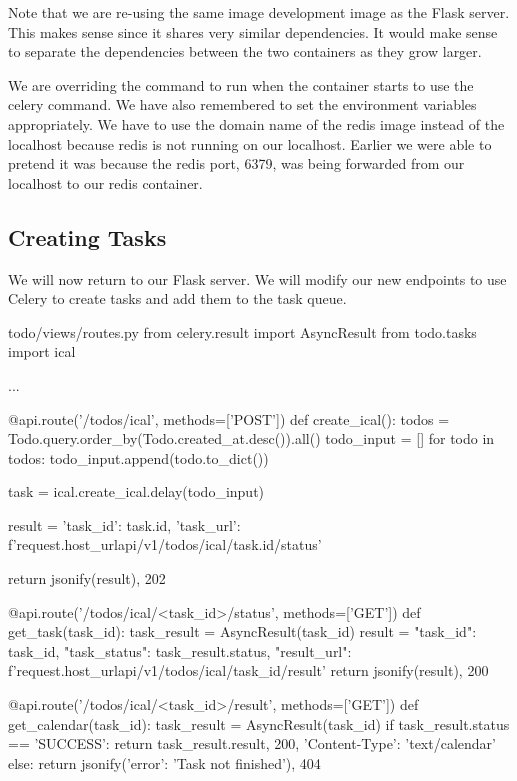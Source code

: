 \documentclass{csse4400}
\begin{document}
Note that we are re-using the same image development image as the Flask server.
This makes sense since it shares very similar dependencies.
It would make sense to separate the dependencies between the two containers as they grow larger.

We are overriding the command to run when the container starts to use the celery command.
We have also remembered to set the environment variables appropriately.
We have to use the domain name of the redis image instead of the localhost because redis is not running on our localhost.
Earlier we were able to pretend it was because the redis port, 6379, was being forwarded from our localhost to our redis container.

\subsection{Creating Tasks}

We will now return to our Flask server.
We will modify our new endpoints to use Celery to create tasks and add them to the task queue.
%
\begin{code}[language=python,numbers=none]{todo/views/routes.py}
from celery.result import AsyncResult
from todo.tasks import ical

...

@api.route('/todos/ical', methods=['POST'])
def create_ical():
    todos = Todo.query.order_by(Todo.created_at.desc()).all()
    todo_input = []
    for todo in todos:
        todo_input.append(todo.to_dict())

    task = ical.create_ical.delay(todo_input)

    result = {
        'task_id': task.id,
        'task_url': f'{request.host_url}api/v1/todos/ical/{task.id}/status'
    }

    return jsonify(result), 202

@api.route('/todos/ical/<task_id>/status', methods=['GET'])
def get_task(task_id):
    task_result = AsyncResult(task_id)
    result = {
        "task_id": task_id,
        "task_status": task_result.status,
        "result_url": f'{request.host_url}api/v1/todos/ical/{task_id}/result'
    }
    return jsonify(result), 200

@api.route('/todos/ical/<task_id>/result', methods=['GET'])
def get_calendar(task_id):
    task_result = AsyncResult(task_id)
    if task_result.status == 'SUCCESS':
        return task_result.result, 200, {'Content-Type': 'text/calendar'}
    else:
        return jsonify({'error': 'Task not finished'}), 404
\end{code}
\end{document}
